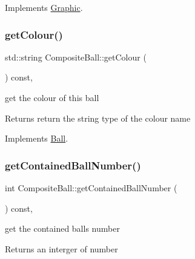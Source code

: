 Implements \mbox{\hyperlink{class_graphic_aed0af75ae3756baeb3fe663ae5f36f29}{Graphic}}.

\mbox{\label{class_composite_ball_aed883fc6572063ba2e3173e4a78ed6bf}} 
\subsubsection{\texorpdfstring{get\+Colour()}{getColour()}}
{\footnotesize\ttfamily std\+::string Composite\+Ball\+::get\+Colour (\begin{DoxyParamCaption}{ }\end{DoxyParamCaption}) const\hspace{0.3cm}{\ttfamily [override]}, {\ttfamily [virtual]}}



get the colour of this ball 

\begin{DoxyReturn}{Returns}
return the string type of the colour name 
\end{DoxyReturn}


Implements \mbox{\hyperlink{class_ball_a248c8a5fc9b8770840f275ea7057b012}{Ball}}.

\mbox{\label{class_composite_ball_a8120a00750a9bb77fd6e41f98de119b3}} 
\subsubsection{\texorpdfstring{get\+Contained\+Ball\+Number()}{getContainedBallNumber()}}
{\footnotesize\ttfamily int Composite\+Ball\+::get\+Contained\+Ball\+Number (\begin{DoxyParamCaption}{ }\end{DoxyParamCaption}) const\hspace{0.3cm}{\ttfamily [override]}, {\ttfamily [virtual]}}



get the contained ball\textquotesingle{}s number 

\begin{DoxyReturn}{Returns}
an interger of number 
\end{DoxyReturn}


